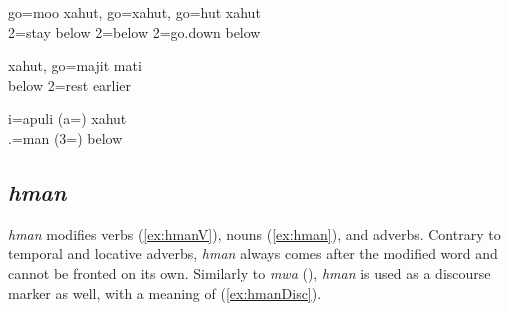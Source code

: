 \begin{table}
	\caption{Locative adverbs}
\label{tab:LocAdv}
\end{table}


\ea\label{ex:xahut1}
\gll go=moo xahut, go=xahut, go=hut xahut\\
 2=stay below 2=below 2=go.down below\\
\glt {}
\z


\ea\label{ex:front_xahut}
\gll xahut, go=majit mati\\
 below 2=rest earlier\\
\glt {}
\z


\ea\label{ex:LocAdvPred}
\gll i=apuli (a=) xahut\\
 .=man (3=) below\\
\glt {}
\z

\subsection{\textit{hman} }
\textit{hman}  modifies verbs (\ref{ex:hmanV}), nouns (\ref{ex:hman}), and adverbs. Contrary to temporal and locative adverbs, \textit{hman} always comes after the modified word and cannot be fronted on its own. Similarly to \textit{mwa} (), \textit{hman} is used as a discourse marker as well, with a meaning of  (\ref{ex:hmanDisc}).

